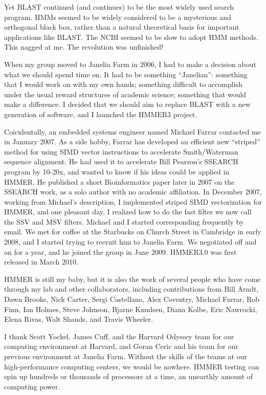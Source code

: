 Yet BLAST continued (and continues) to be the most widely used search
program. HMMs seemed to be widely considered to be a mysterious and
orthogonal black box, rather than a natural theoretical basis for
important applications like BLAST. The NCBI seemed to be slow to adopt
HMM methods. This nagged at me. The revolution was unfinished!

When my group moved to Janelia Farm in 2006, I had to make a decision
about what we should spend time on. It had to be something
``Janelian'': something that I would work on with my own hands;
something difficult to accomplish under the usual reward structures of
academic science; something that would make a difference. I decided
that we should aim to replace BLAST with a new generation of software,
and I launched the HMMER3 project.

Coicidentally, an embedded systems engineer named Michael Farrar
contacted me in January 2007. As a side hobby, Farrar has developed an
efficient new ``striped'' method for using SIMD vector instructions to
accelerate Smith/Waterman sequence alignment. He had used it to
accelerate Bill Pearson's SSEARCH program by 10-20x, and wanted to
know if his ideas could be applied in HMMER. He published a short
Bioinformatics paper later in 2007 on the SSEARCH work, as a solo
author with no academic affiliation. In December 2007, working from
Michael's description, I implemented striped SIMD vectorization for
HMMER, and one pleasant day, I realized how to do the fast filter we
now call the SSV and MSV filters. Michael and I started corresponding
frequently by email. We met for coffee at the Starbucks on Church
Street in Cambridge in early 2008, and I started trying to recruit him
to Janelia Farm. We negotiated off and on for a year, and he joined
the group in June 2009. HMMER3.0 was first released in March 2010.

HMMER is still my baby, but it is also the work of several people who
have come through my lab and other collaborators, including
contributions from Bill Arndt, Dawn Brooks, Nick Carter, Sergi
Castellano, Alex Coventry, Michael Farrar, Rob Finn, Ian Holmes, Steve
Johnson, Bjarne Knudsen, Diana Kolbe, Eric Nawrocki, Elena Rivas, Walt
Shands, and Travis Wheeler.

I thank Scott Yockel, James Cuff, and the Harvard Odyssey team for our
computing environment at Harvard, and Goran Ceric and his team for our
previous environment at Janelia Farm.  Without the skills of the teams
at our high-performance computing centers, we would be nowhere. HMMER
testing can spin up hundreds or thousands of processors at a time, an
unearthly amount of computing power.


